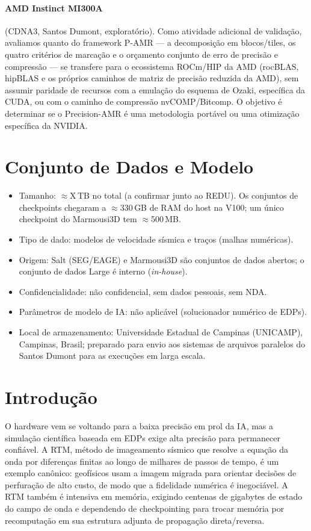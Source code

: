 \documentclass[12pt,a4paper]{article}
\newcommand{\pamr}{P\nobreakdash-AMR}
\begin{document}
\paragraph{AMD Instinct MI300A} (CDNA3, Santos Dumont, exploratório). Como
atividade adicional de validação, avaliamos quanto do framework \pamr{} --- a
decomposição em blocos/tiles, os quatro critérios de marcação e o orçamento
conjunto de erro de precisão e compressão --- se transfere para o ecossistema
ROCm/HIP da AMD (rocBLAS, hipBLAS e os próprios caminhos de matriz de precisão
reduzida da AMD), sem assumir paridade de recursos com a emulação do esquema
de Ozaki, específica da CUDA, ou com o caminho de compressão nvCOMP/Bitcomp. O
objetivo é determinar se o Precision-AMR é uma metodologia portável ou uma
otimização específica da NVIDIA.

\section{Conjunto de Dados e Modelo}

\begin{itemize}
  \item Tamanho: $\approx$X\,TB no total (a confirmar junto ao REDU). Os
        conjuntos de checkpoints chegaram a $\approx$330\,GB de RAM do host na
        V100; um único checkpoint do Marmousi3D tem $\approx$500\,MB.
  \item Tipo de dado: modelos de velocidade sísmica e traços (malhas
        numéricas).
  \item Origem: Salt (SEG/EAGE) e Marmousi3D são conjuntos de dados abertos; o
        conjunto de dados Large é interno (\emph{in-house}).
  \item Confidencialidade: não confidencial, sem dados pessoais, sem NDA.
  \item Parâmetros de modelo de IA: não aplicável (solucionador numérico de
        EDPs).
  \item Local de armazenamento: Universidade Estadual de Campinas (UNICAMP),
        Campinas, Brasil; preparado para envio aos sistemas de arquivos
        paralelos do Santos Dumont para as execuções em larga escala.
\end{itemize}

\section{Introdução}

O hardware vem se voltando para a baixa precisão em prol da IA, mas a
simulação científica baseada em EDPs exige alta precisão para permanecer
confiável. A RTM, método de imageamento sísmico que resolve a equação da onda
por diferenças finitas ao longo de milhares de passos de tempo, é um exemplo
canônico: geofísicos usam a imagem migrada para orientar decisões de
perfuração de alto custo, de modo que a fidelidade numérica é inegociável. A
RTM também é intensiva em memória, exigindo centenas de gigabytes de estado do
campo de onda e dependendo de checkpointing para trocar memória por
recomputação em sua estrutura adjunta de propagação direta/reversa.
\end{document}
